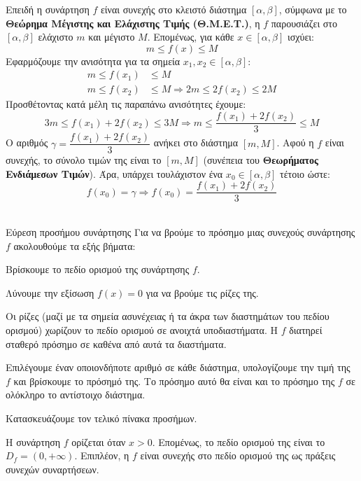\lysh
Επειδή η συνάρτηση $f$ είναι συνεχής στο κλειστό διάστημα $[\alpha, \beta]$, σύμφωνα με το \textbf{Θεώρημα Μέγιστης και Ελάχιστης Τιμής (Θ.Μ.Ε.Τ.)}, η $f$ παρουσιάζει στο $[\alpha, \beta]$ ελάχιστο $m$ και μέγιστο $M$. Επομένως, για κάθε $x \in [\alpha, \beta]$ ισχύει:
\[ m \le f(x) \le M \]
Εφαρμόζουμε την ανισότητα για τα σημεία $x_1, x_2 \in [\alpha, \beta]$:
\begin{align*}
m \le f(x_1) &\le M \\
m \le f(x_2) &\le M \Rightarrow 2m \le 2f(x_2) \le 2M
\end{align*}
Προσθέτοντας κατά μέλη τις παραπάνω ανισότητες έχουμε:
\[ 3m \le f(x_1) + 2f(x_2) \le 3M \Rightarrow m \le \dfrac{f(x_1) + 2f(x_2)}{3} \le M \]
Ο αριθμός $\gamma = \dfrac{f(x_1) + 2f(x_2)}{3}$ ανήκει στο διάστημα $[m, M]$. Αφού η $f$ είναι συνεχής, το σύνολο τιμών της είναι το $[m, M]$ (συνέπεια του \textbf{Θεωρήματος Ενδιάμεσων Τιμών}). Άρα, υπάρχει τουλάχιστον ένα $x_0 \in [\alpha, \beta]$ τέτοιο ώστε:
\[ f(x_0) = \gamma \Rightarrow f(x_0) = \dfrac{f(x_1) + 2f(x_2)}{3} \]\\

\begin{askhsh}{Εύρεση προσήμου συνάρτησης}
Για να βρούμε το πρόσημο μιας συνεχούς συνάρτησης $f$ ακολουθούμε τα εξής βήματα:

\bhmata
\begin{bhma}
\item Βρίσκουμε το πεδίο ορισμού της συνάρτησης $f$.
\item Λύνουμε την εξίσωση $f(x)=0$ για να βρούμε τις ρίζες της.
\item Οι ρίζες (μαζί με τα σημεία ασυνέχειας ή τα άκρα των διαστημάτων του πεδίου ορισμού) χωρίζουν το πεδίο ορισμού σε ανοιχτά υποδιαστήματα. Η $f$ διατηρεί σταθερό πρόσημο σε καθένα από αυτά τα διαστήματα.
\item Επιλέγουμε έναν οποιονδήποτε αριθμό σε κάθε διάστημα, υπολογίζουμε την τιμή της $f$ και βρίσκουμε το πρόσημό της. Το πρόσημο αυτό θα είναι και το πρόσημο της $f$ σε ολόκληρο το αντίστοιχο διάστημα.
\item Κατασκευάζουμε τον τελικό πίνακα προσήμων.
\end{bhma}
\end{askhsh}


\lysh
Η συνάρτηση $f$ ορίζεται όταν $x > 0$. Επομένως, το πεδίο ορισμού της είναι το $D_f = (0, +\infty)$. Επιπλέον, η $f$ είναι συνεχής στο πεδίο ορισμού της ως πράξεις συνεχών συναρτήσεων.

